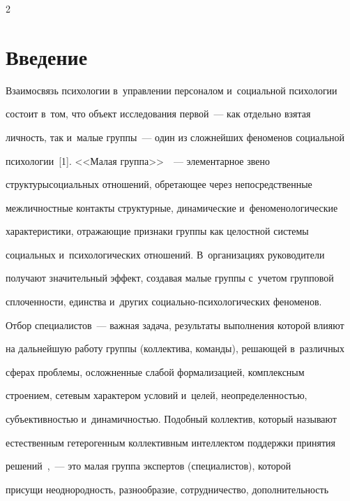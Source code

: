 \begin{multicols}{2}



\label{st\stat}

  

\section{Введение}



  Взаимосвязь психологии в~управлении персоналом и~социальной психологии 

состоит в~том, что объект исследования первой~--- как отдельно взятая 

личность, так и~малые группы~--- один из сложнейших феноменов социальной 

психологии~[1]. <<Малая группа>>~\cite{2-r}~--- элементарное звено 

структуры\linebreak социальных отношений, обретающее через непосредственные 

межличностные контакты структурные, динамические и~феноменологические 

характеристики, отражающие признаки группы как \mbox{целостной} системы 

социальных и~психологических отношений. В~организациях руководители 

получают значительный эффект, создавая малые группы с~учетом групповой 

сплоченности, единства и~других социально-психологических феноменов. 



Отбор специалистов~--- важная задача, результаты выполнения которой влияют 

на дальнейшую работу группы (коллектива, команды), ре\-ша\-ющей в~различных 

сферах проб\-ле\-мы, \mbox{осложненные} слабой формализацией, комплексным 

строением, сетевым характером условий и~целей, неопределенностью, 

субъективностью и~ди\-на\-мич\-ностью. Подобный коллектив, который называют 

естественным гетерогенным коллективным интеллектом поддержки принятия 

решений~\cite{3-r},~--- это малая группа экспертов (специалистов), которой\linebreak 

присущи не\-од\-но\-род\-ность, разнообразие, сотрудничество, до\-пол\-ни\-тель\-ность 


\end{multicols}

